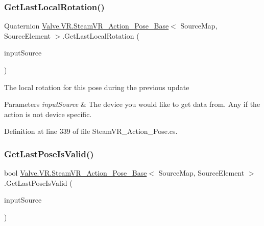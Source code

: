 \subsubsection{\texorpdfstring{GetLastLocalRotation()}{GetLastLocalRotation()}}
{\footnotesize\ttfamily Quaternion \mbox{\hyperlink{class_valve_1_1_v_r_1_1_steam_v_r___action___pose___base}{Valve.\+V\+R.\+Steam\+V\+R\+\_\+\+Action\+\_\+\+Pose\+\_\+\+Base}}$<$ Source\+Map, Source\+Element $>$.Get\+Last\+Local\+Rotation (\begin{DoxyParamCaption}\item[{\mbox{\hyperlink{namespace_valve_1_1_v_r_a82e5bf501cc3aa155444ee3f0662853f}{Steam\+V\+R\+\_\+\+Input\+\_\+\+Sources}}}]{input\+Source }\end{DoxyParamCaption})}



The local rotation for this pose during the previous update 


\begin{DoxyParams}{Parameters}
{\em input\+Source} & The device you would like to get data from. Any if the action is not device specific.\\
\hline
\end{DoxyParams}


Definition at line 339 of file Steam\+V\+R\+\_\+\+Action\+\_\+\+Pose.\+cs.

\mbox{\label{class_valve_1_1_v_r_1_1_steam_v_r___action___pose___base_a0071aa67fdb7a1f25f261f58236f182d}} 
\subsubsection{\texorpdfstring{GetLastPoseIsValid()}{GetLastPoseIsValid()}}
{\footnotesize\ttfamily bool \mbox{\hyperlink{class_valve_1_1_v_r_1_1_steam_v_r___action___pose___base}{Valve.\+V\+R.\+Steam\+V\+R\+\_\+\+Action\+\_\+\+Pose\+\_\+\+Base}}$<$ Source\+Map, Source\+Element $>$.Get\+Last\+Pose\+Is\+Valid (\begin{DoxyParamCaption}\item[{\mbox{\hyperlink{namespace_valve_1_1_v_r_a82e5bf501cc3aa155444ee3f0662853f}{Steam\+V\+R\+\_\+\+Input\+\_\+\+Sources}}}]{input\+Source }\end{DoxyParamCaption})}



